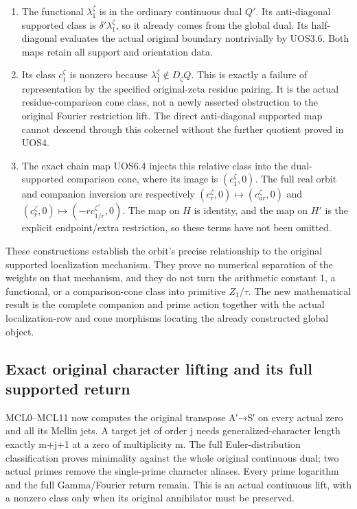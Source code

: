 \begin{enumerate}
\def\labelenumi{\arabic{enumi}.}
\item
  The functional \(\lambda_1^\zeta\) is in the ordinary continuous dual
  \(Q'\). Its anti-diagonal supported class is
  \(\delta'\lambda_1^\zeta\), so it already comes from the global dual.
  Its half-diagonal evaluates the actual original boundary nontrivially
  by UOS3.6. Both maps retain all support and orientation data.
\item
  Its class \(c_1^\zeta\) is nonzero because
  \(\lambda_1^\zeta\notin D_\zeta Q\). This is exactly a failure of
  representation by the specified original-zeta residue pairing. It is
  the actual residue-comparison cone class, not a newly asserted
  obstruction to the original Fourier restriction lift. The direct
  anti-diagonal supported map cannot descend through this cokernel
  without the further quotient proved in UOS4.
\item
  The exact chain map UOS6.4 injects this relative class into the
  dual-supported comparison cone, where its image is \((c_1^\zeta,0)\).
  The full real orbit and companion inversion are respectively
  \((c_r^\zeta,0)\mapsto(c_{ar}^\zeta,0)\) and
  \((c_r^\zeta,0)\mapsto(-r c_{1/r}^{\zeta^\vee},0)\). The map on \(H\)
  is identity, and the map on \(H'\) is the explicit endpoint/extra
  restriction, so these terms have not been omitted.
\end{enumerate}

These constructions establish the orbit's precise relationship to the
original supported localization mechanism. They prove no numerical
separation of the weights on that mechanism, and they do not turn the
arithmetic constant \(1\), a functional, or a comparison-cone class into
primitive \(Z_1/\tau\). The new mathematical result is the complete
companion and prime action together with the actual localization-row and
cone morphisms locating the already constructed global object.

\subsection{Exact original character lifting and its full supported
return}\label{exact-original-character-lifting-and-its-full-supported-return-occurrence-3}

MCL0--MCL11 now computes the original transpose A′→S′ on every actual
zero and all its Mellin jets. A target jet of order j needs
generalized-character length exactly m+j+1 at a zero of multiplicity m.
The full Euler-distribution classification proves minimality against the
whole original continuous dual; two actual primes remove the
single-prime character aliases. Every prime logarithm and the full
Gamma/Fourier return remain. This is an actual continuous lift, with a
nonzero class only when its original annihilator must be preserved.

